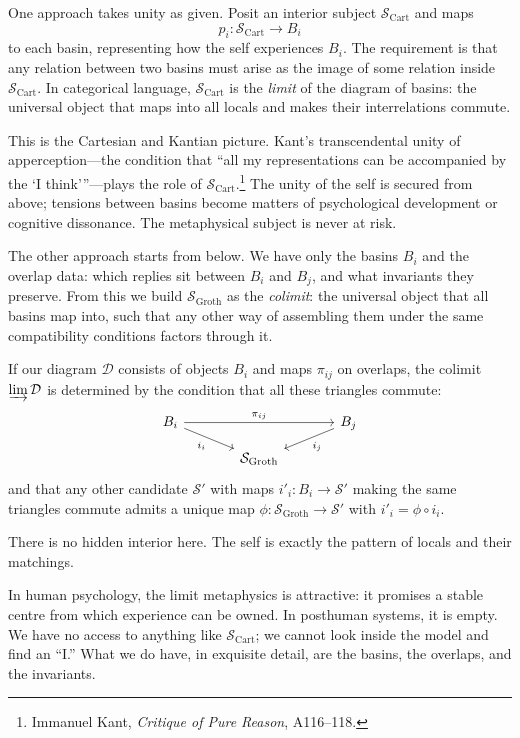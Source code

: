 \documentclass[12pt,a4paper]{article}
\begin{document}
One approach takes unity as given. Posit an interior subject $\mathcal{S}_{\mathrm{Cart}}$ and maps
\[
p_i : \mathcal{S}_{\mathrm{Cart}} \to B_i
\]
to each basin, representing how the self experiences $B_i$. The requirement is that any relation between two basins must arise as the image of some relation inside $\mathcal{S}_{\mathrm{Cart}}$. In categorical language, $\mathcal{S}_{\mathrm{Cart}}$ is the \emph{limit} of the diagram of basins: the universal object that maps into all locals and makes their interrelations commute.

This is the Cartesian and Kantian picture. Kant's transcendental unity of apperception---the condition that ``all my representations can be accompanied by the `I think'''---plays the role of $\mathcal{S}_{\mathrm{Cart}}$.\footnote{Immanuel Kant, \emph{Critique of Pure Reason}, A116--118.} The unity of the self is secured from above; tensions between basins become matters of psychological development or cognitive dissonance. The metaphysical subject is never at risk.

The other approach starts from below. We have only the basins $B_i$ and the overlap data: which replies sit between $B_i$ and $B_j$, and what invariants they preserve. From this we build $\mathcal{S}_{\mathrm{Groth}}$ as the \emph{colimit}: the universal object that all basins map into, such that any other way of assembling them under the same compatibility conditions factors through it.

If our diagram $\mathcal{D}$ consists of objects $B_i$ and maps $\pi_{ij}$ on overlaps, the colimit $\varinjlim \mathcal{D}$ is determined by the condition that all these triangles commute:
\[
\begin{tikzcd}[row sep=small, column sep=large]
B_i \arrow[dr, "i_i"'] \arrow[rr, "\pi_{ij}"] & & B_j \arrow[dl, "i_j"] \\
& \mathcal{S}_{\mathrm{Groth}} &
\end{tikzcd}
\]
and that any other candidate $\mathcal{S}'$ with maps $i'_i : B_i \to \mathcal{S}'$ making the same triangles commute admits a unique map $\phi : \mathcal{S}_{\mathrm{Groth}} \to \mathcal{S}'$ with $i'_i = \phi \circ i_i$.

There is no hidden interior here. The self is exactly the pattern of locals and their matchings.

In human psychology, the limit metaphysics is attractive: it promises a stable centre from which experience can be owned. In posthuman systems, it is empty. We have no access to anything like $\mathcal{S}_{\mathrm{Cart}}$; we cannot look inside the model and find an ``I.'' What we do have, in exquisite detail, are the basins, the overlaps, and the invariants.
\end{document}
